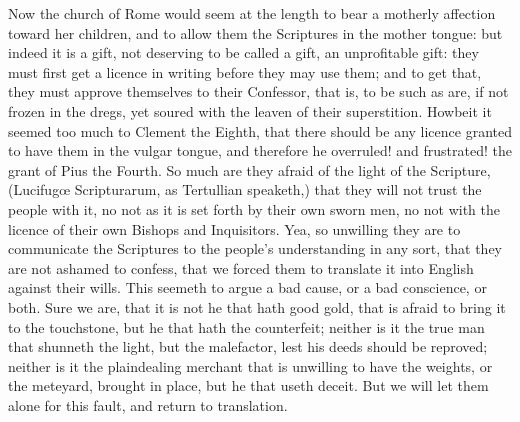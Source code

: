 Now the church of Rome would seem at the length to bear a motherly affection toward her children, and to allow them the Scriptures in the mother tongue: but indeed it is a gift, not deserving to be called a gift, an unprofitable gift: they must first get a licence in writing before they may use them; and to get that, they must approve themselves to their Confessor, that is, to be such as are, if not frozen in the dregs, yet soured with the leaven of their superstition. Howbeit it seemed too much to Clement the Eighth, that there should be any licence granted to have them in the vulgar tongue, and therefore he overruled! and frustrated! the grant of Pius the Fourth. So much are they afraid of the light of the Scripture, (Lucifugœ Scripturarum, as Tertullian speaketh,) that they will not trust the people with it, no not as it is set forth by their own sworn men, no not with the licence of their own Bishops and Inquisitors. Yea, so unwilling they are to communicate the Scriptures to the people's understanding in any sort, that they are not ashamed to confess, that we forced them to translate it into English against their wills. This seemeth to argue a bad cause, or a bad conscience, or both. Sure we are, that it is not he that hath good gold, that is afraid to bring it to the touchstone, but he that hath the counterfeit; neither is it the true man that shunneth the light, but the malefactor, lest his deeds should be reproved; neither is it the plaindealing merchant that is unwilling to have the weights, or the meteyard, brought in place, but he that useth deceit. But we will let them alone for this fault, and return to translation.


